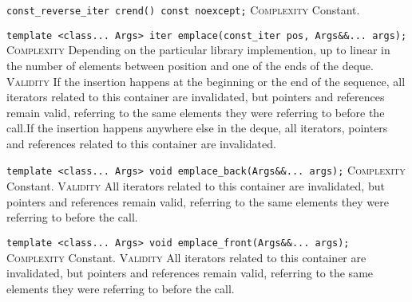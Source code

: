 \noindent{}\hspace*{0.25em}\lstinline[basicstyle=\ttfamily\color{cgreen}]{const_reverse_iter crend() const noexcept;} \textsc{Complexity} Constant.\\\vspace{-0.6em}

\noindent{}\hspace*{0.25em}\lstinline[basicstyle=\ttfamily\color{corange}]{template <class... Args> iter emplace(const_iter pos, Args&&... args);} \textsc{Complexity} Depending on the particular library implemention, up to linear in the number of elements between position and one of the ends of the deque. \textsc{Validity} If the insertion happens at the beginning or the end of the sequence, all iterators related to this container are invalidated, but pointers and references remain valid, referring to the same elements they were referring to before the call.If the insertion happens anywhere else in the deque, all iterators, pointers and references related to this container are invalidated.\\\vspace{-0.6em}

\noindent{}\hspace*{0.25em}\lstinline[basicstyle=\ttfamily\color{cgreen}]{template <class... Args> void emplace_back(Args&&... args);} \textsc{Complexity} Constant. \textsc{Validity} All iterators related to this container are invalidated, but pointers and references remain valid, referring to the same elements they were referring to before the call.\\\vspace{-0.6em}

\noindent{}\hspace*{0.25em}\lstinline[basicstyle=\ttfamily\color{cgreen}]{template <class... Args> void emplace_front(Args&&... args);} \textsc{Complexity} Constant. \textsc{Validity} All iterators related to this container are invalidated, but pointers and references remain valid, referring to the same elements they were referring to before the call.\\\vspace{-0.6em}

